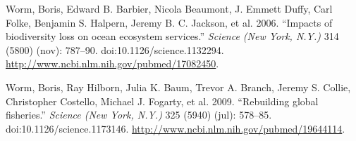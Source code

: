 \documentclass[author-year, review]{elsarticle} %
\begin{document}
Worm, Boris, Edward B. Barbier, Nicola Beaumont, J. Emmett Duffy, Carl
Folke, Benjamin S. Halpern, Jeremy B. C. Jackson, et al. 2006. ``Impacts
of biodiversity loss on ocean ecosystem services.'' \emph{Science (New
York, N.Y.)} 314 (5800) (nov): 787--90. doi:10.1126/science.1132294.
\url{http://www.ncbi.nlm.nih.gov/pubmed/17082450}.

Worm, Boris, Ray Hilborn, Julia K. Baum, Trevor A. Branch, Jeremy S.
Collie, Christopher Costello, Michael J. Fogarty, et al. 2009.
``Rebuilding global fisheries.'' \emph{Science (New York, N.Y.)} 325
(5940) (jul): 578--85. doi:10.1126/science.1173146.
\url{http://www.ncbi.nlm.nih.gov/pubmed/19644114}.
\end{document}
